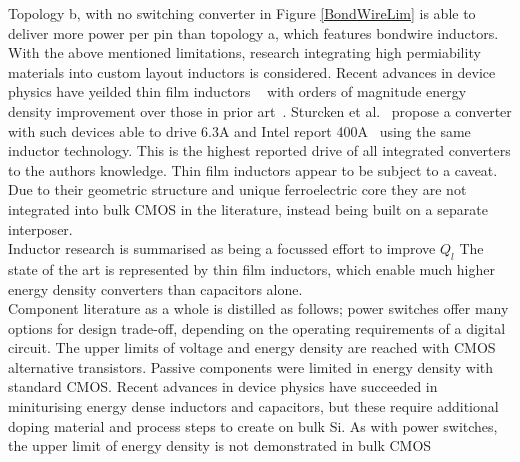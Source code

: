 \documentclass[letterpaper,twocolumn,10pt]{article}
\begin{document}
Topology b, with no switching converter in Figure \ref{BondWireLim} is able to deliver more power per pin than topology a, which features bondwire inductors.\\
\indent With the above mentioned limitations, research integrating high permiability materials into custom layout inductors is considered. Recent advances in device physics have yeilded thin film inductors ~\cite{OSulivan2013} with orders of magnitude energy density improvement over those in prior art~\cite{Meere2009}. Sturcken et al.~\cite{Sturcken2013} propose a converter with such devices able to drive 6.3A and Intel report 400A~\cite{Intel2010} using the same inductor technology. This is the highest reported drive of all integrated converters to the authors knowledge. Thin film inductors appear to be subject to a caveat. Due to their geometric structure and unique ferroelectric core they are not integrated into bulk CMOS in the literature, instead being built on a separate interposer.\\
\indent Inductor research is summarised as being a focussed effort to improve $Q_l$ The state of the art is represented by thin film inductors, which enable much higher energy density converters than capacitors alone.\\


\indent Component literature as a whole is distilled as follows; power switches offer many options for design trade-off, depending on the operating requirements of a digital circuit. The upper limits of voltage and energy density are reached with CMOS alternative transistors. Passive components were limited in energy density with standard CMOS. Recent advances in device physics have succeeded in miniturising energy dense inductors and capacitors, but these require additional doping material and process steps to create on bulk Si. As with power switches, the upper limit of energy density is not demonstrated in bulk CMOS\\
\end{document}
